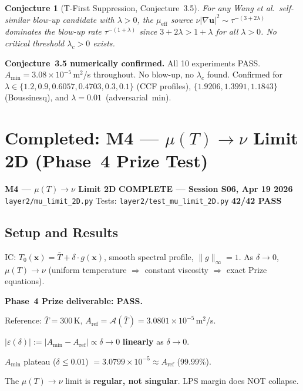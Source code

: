 \documentclass[11pt, a4paper]{article}
\newtheorem{conjecture}[theorem]{Conjecture}
\theoremstyle{definition}
\theoremstyle{remark}
\newenvironment{keyresult}{%
  \begin{tcolorbox}[colback=tfgreen!6, colframe=tfgreen!60!black,
    title=\textbf{Key Result}, fonttitle=\small\bfseries,
    breakable, left=4pt, right=4pt, top=4pt, bottom=4pt]
}{%
  \end{tcolorbox}
}
\newenvironment{milestone}{%
  \begin{tcolorbox}[colback=tfblue!5, colframe=tfblue!50!black,
    breakable, left=4pt, right=4pt, top=4pt, bottom=4pt]
}{%
  \end{tcolorbox}
}
\newcommand{\Afield}{\mathcal{A}}
\newcommand{\eps}{\varepsilon}
\newcommand{\lam}{\lambda}
\newcommand{\mueff}{\mu_{\mathrm{eff}}}
\begin{document}
\begin{conjecture}[T-First Suppression, Conjecture~3.5]
  For any Wang et al.\ self-similar blow-up candidate with $\lam > 0$,
  the $\mueff$ source $\nu|\nabla\mathbf{u}|^2 \sim \tau^{-(3+2\lam)}$ dominates
  the blow-up rate $\tau^{-(1+\lam)}$ since $3+2\lam > 1+\lam$ for all $\lam > 0$.
  No critical threshold $\lam_c > 0$ exists.
\end{conjecture}

\begin{keyresult}
\textbf{Conjecture~3.5 numerically confirmed.}
All 10 experiments PASS. $A_{\min} = 3.08\times10^{-5}$\,m$^2$/s throughout.
No blow-up, no $\lam_c$ found. Confirmed for $\lam \in \{1.2, 0.9, 0.6057, 0.4703, 0.3, 0.1\}$
(CCF profiles), $\{1.9206, 1.3991, 1.1843\}$ (Boussinesq), and $\lam = 0.01$~(adversarial~min).
\end{keyresult}

\section{Completed: M4 --- $\mu(T)\to\nu$ Limit 2D (Phase~4 Prize Test)}

\begin{milestone}
  \textbf{M4 --- $\mu(T)\to\nu$ Limit 2D}
  \hfill {\color{passgreen}\textbf{COMPLETE --- Session S06, Apr 19 2026}}\\[4pt]
  \texttt{layer2/mu\_limit\_2D.py} \quad Tests: \texttt{layer2/test\_mu\_limit\_2D.py}
  \quad \textbf{42/42 PASS}
\end{milestone}

\subsection{Setup and Results}

IC: $T_0(\mathbf{x}) = \bar{T} + \delta\cdot g(\mathbf{x})$, smooth spectral profile, $\|g\|_\infty = 1$.
As $\delta\to 0$, $\mu(T)\to\nu$ (uniform temperature $\Rightarrow$ constant viscosity $\Rightarrow$ exact Prize equations).

\begin{keyresult}
\textbf{Phase~4 Prize deliverable: PASS.}

Reference: $\bar{T} = 300$\,K, $A_{\mathrm{ref}} = \Afield(\bar{T}) = 3.0801\times10^{-5}$\,m$^2$/s.

\medskip
$|\eps(\delta)| := |A_{\min} - A_{\mathrm{ref}}| \propto \delta \to 0$ \textbf{linearly} as $\delta \to 0$.

$A_{\min}$ plateau ($\delta \leq 0.01$) $= 3.0799\times10^{-5} \approx A_{\mathrm{ref}}$ (99.99\%).

The $\mu(T)\to\nu$ limit is \textbf{regular, not singular}. LPS margin does NOT collapse.
\end{keyresult}
\end{document}
